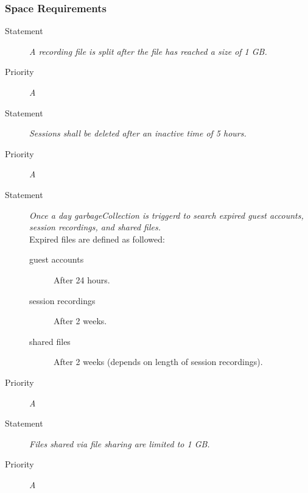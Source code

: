 \subsubsection{Space Requirements}

\NFR
\begin{description}
\item[Statement] \textit{A recording file is split after the file has reached
    a size of 1 GB.}
\item[Priority] \textit{A}
\end{description}

\NFR
\begin{description}
\item[Statement] \textit{Sessions shall be deleted after an inactive time of 5
    hours.}
\item[Priority] \textit{A}
\end{description}

\NFR
\begin{description}
\item[Statement] \textit{Once a day \gls{garbageCollection} is triggerd to
    search expired guest accounts, session recordings, and shared files.}\\
  Expired files are defined as followed:
  \begin{description}
  \item[guest accounts] After 24 hours.
  \item[session recordings] After 2 weeks.
  \item[shared files] After 2 weeks (depends on length of session recordings).
  \end{description}
\item[Priority] \textit{A}
\end{description}

\NFR
\begin{description}
\item[Statement] \textit{Files shared via file sharing are limited to 1 GB.}
\item[Priority] \textit{A}
\end{description}